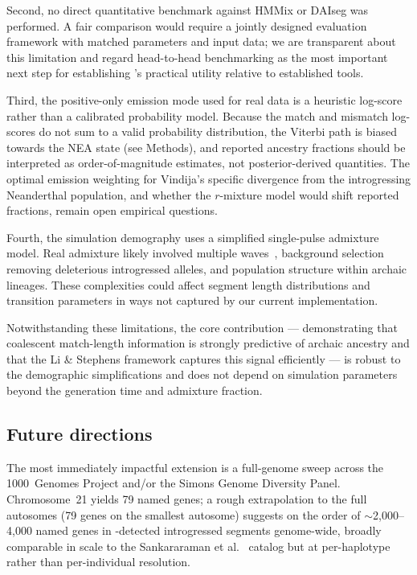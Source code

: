 Second, no direct quantitative benchmark against HMMix or DAIseg was performed.
A fair comparison would require a jointly designed evaluation framework with
matched parameters and input data; we are transparent about this limitation
and regard head-to-head benchmarking as the most important next step for
establishing \AP{}'s practical utility relative to established tools.

Third, the positive-only emission mode used for real data is a heuristic
log-score rather than a calibrated probability model.
Because the match and mismatch log-scores do not sum to a valid probability
distribution, the Viterbi path is biased towards the NEA state
(see Methods), and reported ancestry fractions should be interpreted as
order-of-magnitude estimates, not posterior-derived quantities.
The optimal emission weighting for Vindija's specific divergence
from the introgressing Neanderthal population, and whether the
$r$-mixture model would shift reported fractions, remain open empirical questions.

Fourth, the simulation demography uses a simplified single-pulse admixture model.
Real admixture likely involved multiple waves~\citep{vernot2016excavating},
background selection removing deleterious introgressed alleles, and population
structure within archaic lineages.
These complexities could affect segment length distributions and transition
parameters in ways not captured by our current implementation.

Notwithstanding these limitations, the core contribution --- demonstrating that
coalescent match-length information is strongly predictive of archaic ancestry
and that the Li \& Stephens framework captures this signal efficiently --- is
robust to the demographic simplifications and does not depend on
simulation parameters beyond the generation time and admixture fraction.

\subsection*{Future directions}

The most immediately impactful extension is a full-genome sweep across the
1000~Genomes Project and/or the Simons Genome Diversity Panel.
Chromosome~21 yields 79 named genes; a rough extrapolation to the full autosomes (79 genes on the smallest
autosome) suggests on the order of $\sim$2,000--4,000 named genes in
\AP{}-detected introgressed segments genome-wide, broadly comparable in
scale to the Sankararaman et al.~\citeyear{sankararaman2014genomic} catalog
but at per-haplotype rather than per-individual resolution.

